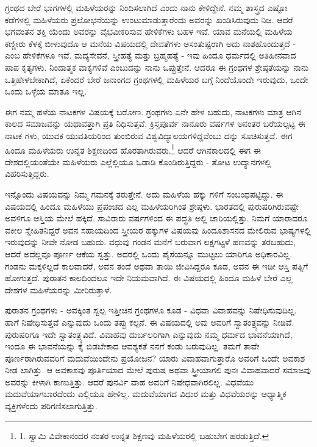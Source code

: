 ಗ್ರಂಥದ ಬೇರೆ ಭಾಗಗಳಲ್ಲಿ ಮಹಿಳೆಯರನ್ನು ನಿಂದಿಸಲಾಗಿದೆ ಎಂದು ನಾನು ಕೇಳಿದ್ದೇನೆ. ನಮ್ಮ ಶಾಸ್ತ್ರದ ಎಷ್ಟೋ ಕಡೆಗಳಲ್ಲಿ ಮಹಿಳೆಯರು ಪ್ರಲೋಭನೆಯನ್ನು ಉಂಟುಮಾಡುತ್ತಾರೆಂದು ಅವರನ್ನು ಖಂಡಿಸಿರುವುದು ನಿಜ. ಆದರೆ ಭಗವಂತನ ಶಕ್ತಿ ಯೆಂದು ಅವರನ್ನು ವೈಭವೀಕರಿಸುವ ಹೇಳಿಕೆಗಳು ಬಹಳ ಇವೆ. ಯಾವ ಮನೆಯಲ್ಲಿ ಮಹಿಳೆಯ ಕಣ್ಣೀರು ಕೆಳಕ್ಕೆ ಬೀಳುವುದೊ ಆ ಮನೆಯ ವಿಷಯದಲ್ಲಿ ದೇವತೆಗಳು ಅಸಂತುಷ್ಟರಾಗಿ ಅದು ನಾಶಹೊಂದುತ್ತದೆ - ಎಂಬ ಹೇಳಿಕೆಗಳೂ ಇವೆ. ಮದ್ಯಸೇವನೆ, ಸ್ತ್ರೀಹತ್ಯೆ ಮತ್ತು ಬ್ರಹ್ಮಹತ್ಯೆ - ಇವು ಹಿಂದೂ ಧರ್ಮದಲ್ಲಿ ಅತಿಹೀನವಾದ ಪಾಪ ಕೃತ್ಯಗಳು. ನಿಂದಾತ್ಮಕ ವಾಕ್ಯಗಳಿವೆ ಎಂಬುದನ್ನು ನಾನು ಒಪ್ಪುತ್ತೇನೆ. ಆದರೂ ಈ ಗ್ರಂಥಗಳ ಶ್ರೇಷ್ಠತೆಯನ್ನು ನಾನು ಒತ್ತಿಹೇಳಬೇಕಾಗಿದೆ, ಏಕೆಂದರೆ ಬೇರೆ ಜನಾಂಗದ ಗ್ರಂಥಗಳಲ್ಲಿ ಮಹಿಳೆಯರ ಬಗ್ಗೆ ನಿಂದೆಯೊಂದೇ ಇರುವುದು, ಒಂದೇ ಒಂದು ಒಳ್ಳೆಯ ಮಾತೂ ಇಲ್ಲ.

ಈಗ ನಮ್ಮ ಹಳೆಯ ನಾಟಕಗಳ ವಿಷಯಕ್ಕೆ ಬರೋಣ. ಗ್ರಂಥಗಳು ಏನೇ ಹೇಳ ಬಹುದು, ನಾಟಕಗಳು ಮಾತ್ರ ಆಗಿನ ಕಾಲದ ಸಮಾಜವನ್ನು ಯಥಾವತ್ತಾಗಿ ಪ್ರತಿ ನಿಧಿಸುತ್ತವೆ. ಕ್ರಿಸ್ತಪೂರ್ವ ನಾನೂರು ವರ್ಷಗಳ ಅನಂತರ ಬರೆಯಲ್ಪಟ್ಟ ಈ ನಾಟಕ ಗಳು, ಯುವಕ ಯುವತಿಯರಿಂದ ತುಂಬಿರುವ ವಿಶ್ವವಿದ್ಯಾಲಯಗಳಿದ್ದವೆಂಬು ದನ್ನು ಸೂಚಿಸುತ್ತವೆ. ಈಗ ಹಿಂದೂ ಮಹಿಳೆಯರು ಉನ್ನತ ಶಿಕ್ಷಣದಿಂದ ಹೊರತಾಗಿರುವರು.\footnote{1. ಸ್ವಾಮಿ ವಿವೇಕಾನಂದರ ನಂತರ ಉನ್ನತ ಶಿಕ್ಷಣವು ಮಹಿಳೆಯರಲ್ಲಿ ಬಹುಬೇಗ ಹರಡುತ್ತಿದೆ.} ಆದರೆ ಆಗಿನಕಾಲದಲ್ಲಿ ಈಗ ಈ ದೇಶದಲ್ಲಿಯಂತೆಯೇ ಮಹಿಳೆಯರು ಎಲ್ಲೆಲ್ಲಿಯೂ ಓಡಾಡಿ ಕೊಂಡಿರುತ್ತಿದ್ದರು - ತೋಟ ಉದ್ಯಾನಗಳಲ್ಲಿ ವಿಹರಿಸುತ್ತಿದ್ದರು.

ಇನ್ನೊಂದು ವಿಷಯವನ್ನು ನಿಮ್ಮ ಗಮನಕ್ಕೆ ತರುತ್ತೇನೆ. ಅದು ಮಹಿಳೆಯ ಹಕ್ಕು ಗಳಿಗೆ ಸಂಬಂಧಪಟ್ಟಿದ್ದು. ಈ ವಿಷಯದಲ್ಲಿ ಹಿಂದೂ ಮಹಿಳೆಯು ಪ್ರಪಂಚದ ಎಲ್ಲ ಮಹಿಳೆಯರಿಗಿಂತ ಶ್ರೇಷ್ಠಳು. ಭಾರತದಲ್ಲಿ ಪುರುಷರಿಗಿರುವಷ್ಟೇ ಅವಳಿಗೂ ಆಸ್ತಿಯ ಮೇಲೆ ಹಕ್ಕಿದೆ. ಸಾವಿರಾರು ವರ್ಷಗಳಿಂದ ಈ ಪದ್ಧತಿ ಅಲ್ಲಿ ಜಾರಿಯಲ್ಲಿತ್ತು. ನಿಮಗೆ ಯಾರಾದರೂ ವಕೀಲ ಸ್ನೇಹಿತನಿದ್ದರೆ ಅವನ ಸಹಾಯದಿಂದ ಸ್ತ್ರೀಯರ ಹಕ್ಕುಗಳ ವಿಷಯವು ಹಿಂದೂಶಾಸನದ ಮೇಲಿರುವ ಭಾಷ್ಯಗಳಲ್ಲಿ ಇರುವುದನ್ನು ನೀವೇ ನೋಡ ಬಹುದು. ವಧುವು ಗಂಡನ ಮನೆಗೆ ಬರುವಾಗ ಲಕ್ಷಗಟ್ಟಳೆ ಹಣವನ್ನು ತರಬಹುದು, ಆದರೆ ಅದೆಲ್ಲವೂ ಪೂರ್ಣ ಆಕೆಯ ಸ್ವತ್ತು. ಅದರಲ್ಲಿ ಒಂದು ಪೈಸೆಯನ್ನೂ ಮುಟ್ಟಲು ಯಾರಿಗೂ ಅಧಿಕಾರವಿಲ್ಲ. ಗಂಡನು ಮಕ್ಕಳಿಲ್ಲದೆ ಕಾಲವಾದರೆ, ಅವನ ತಂದೆ ಅಥವಾ ತಾಯಿ ಜೀವಿಸಿದ್ದರೂ ಕೂಡ, ಅವನ ಈ ಇಡೀ ಆಸ್ತಿ ಪತ್ನಿಗೆ ಹೋಗುತ್ತದೆ. ಪುರಾತನ ಕಾಲದಿಂದಲೂ ಇದೇ ನಿಯಮವಾಗಿದೆ. ಈ ವಿಷಯದಲ್ಲಿ ಹಿಂದೂ ಮಹಿಳೆ ಬೇರೆ ಎಲ್ಲ ದೇಶಗಳ ಮಹಿಳೆಯರನ್ನು ಮೀರಿರುತ್ತಾಳೆ.

ಪುರಾತನ ಗ್ರಂಥಗಳು - ಅವಕ್ಕಿಂತ ಸ್ವಲ್ಪ ಇತ್ತೀಚಿನ ಗ್ರಂಥಗಳೂ ಕೂಡ - ವಿಧವಾ ವಿವಾಹವನ್ನು ನಿಷೇಧಿಸುವುದಿಲ್ಲ. ಹಾಗೆ ನಿಷೇಧಿಸುತ್ತವೆ ಎನ್ನುವುದು ಒಂದು ತಪ್ಪು ಕಲ್ಪನೆ. ಈ ವಿಷಯದಲ್ಲಿ ಅವು ಅವರಿಗೆ ಸ್ವಾತಂತ್ರ್ಯವನ್ನು ನೀಡಿವೆ. ಪುರುಷರಿಗೂ ಇದೇ ಸ್ವಾತಂತ್ರ್ಯವಿದೆ. ವಿವಾಹವು ದುರ್ಬಲರಿಗಾಗಿ ಎನ್ನುವುದು ನಮ್ಮ ಧರ್ಮದ ಭಾವನೆಯಾಗಿದೆ, ಇಂದೂ ಈ ಭಾವನೆಯನ್ನು ಕೈ ಬಿಡಬೇಕಾದ ಆವಶ್ಯಕತೆ ನನಗೆ ಕಂಡು ಬರುವುದಿಲ್ಲ. ತಮಗೆ ತಾವೇ ಪೂರ್ಣರಾಗಿರುವವರಿಗೆ ಮದುವೆಯಿಂದೇನು ಪ್ರಯೋಜನ? ಯಾರು ವಿವಾಹವಾಗುತ್ತಾರೊ ಅವರಿಗೆ ಒಂದೇ ಅವಕಾಶ ನೀಡ ಲಾಗಿತ್ತು. ಆ ಅವಕಾಶವು ಪೂರ್ತಿಯಾದ ಮೇಲೆ ಪುರುಷ ಅಥವಾ ಸ್ತ್ರೀಯಾಗಲಿ ಪುನಃ ವಿವಾಹವಾದರೆ ಸಮಾಜವು ಅವರನ್ನು ಕೀಳಾಗಿ ಕಾಣುತ್ತಿತ್ತು. ಆದರೆ ಪುನರ್ವಿ ವಾಹ ಅವರಿಗೆ ನಿಷೇಧವಾಗಿರಲಿಲ್ಲ. ವಿಧವೆಯು ಮದುವೆಯಾಗಬಾರದೆಂದು ಎಲ್ಲಿಯೂ ಹೇಳಿಲ್ಲ. ಮದುವೆಯಾಗದ ವಿಧುರ ಮತ್ತು ವಿಧವೆಯರನ್ನು ಆಧ್ಯಾತ್ಮಿಕ ವ್ಯಕ್ತಿಗಳೆಂದು ಪರಿಗಣಿಸಲಾಗುತ್ತಿತ್ತು.

